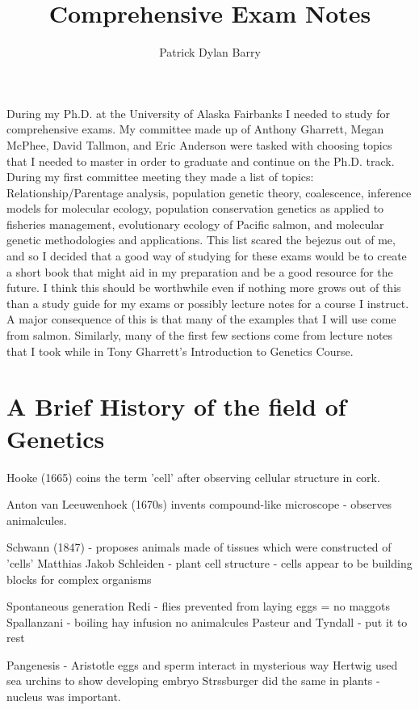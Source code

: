 \documentclass[11pt, oneside]{article}
\title{Comprehensive Exam Notes}
\author{Patrick Dylan Barry}
\begin{document}
\maketitle
\abstract{}
During my Ph.D. at the University of Alaska Fairbanks I needed to study for comprehensive exams.
My committee made up of Anthony Gharrett, Megan McPhee, David Tallmon, and Eric Anderson 
were tasked with choosing topics that I needed to master in order to graduate and continue on the 
Ph.D. track. During my first committee meeting they made a list of topics: Relationship/Parentage analysis,
population genetic theory, coalescence, inference models for molecular ecology, population conservation 
genetics as applied to fisheries management, evolutionary ecology of Pacific salmon, and molecular genetic 
methodologies and applications. This list scared the bejezus out of me, and so I decided 
 that a good way of studying for these exams would be to create a short book that 
might aid in my preparation and be a good resource for the future. I think this should be worthwhile even
if nothing more grows out of this than a study guide for my exams or possibly lecture notes for a course I 
instruct. A major consequence of this is that many of the examples that I will use come from salmon. Similarly,
many of the first few sections come from lecture notes that I took while in Tony Gharrett's Introduction to Genetics Course. 

\newpage

\tableofcontents

\newpage

\section{A Brief History of the field of Genetics}
Hooke (1665) coins the term 'cell' after observing cellular structure in cork.

Anton van Leeuwenhoek (1670s) invents compound-like microscope - observes animalcules.

Schwann (1847) - proposes animals made of tissues which were constructed of 'cells'
Matthias Jakob Schleiden - plant cell structure - cells appear to be building blocks for complex organisms

Spontaneous generation
Redi - flies prevented from laying eggs = no maggots
Spallanzani - boiling hay infusion no animalcules
Pasteur and Tyndall - put it to rest
 
 Pangenesis -
 Aristotle eggs and sperm interact in mysterious way
 Hertwig used sea urchins to show developing embryo
 Strssburger did the same in plants - nucleus was important. 
 
\end{document}
